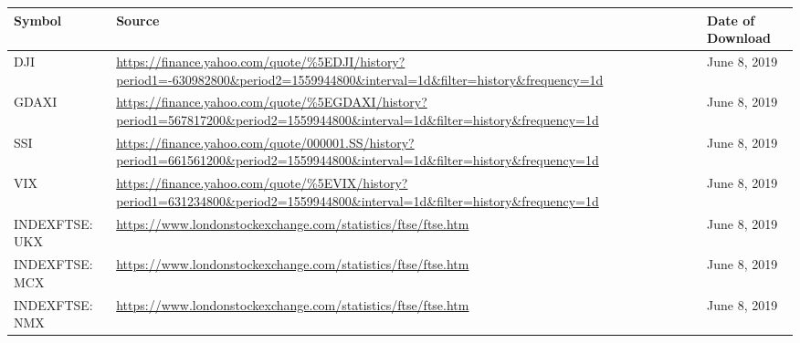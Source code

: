 \documentclass[12pt, a4paper]{article}
\begin{document}
        \begin{table}[H]
    \centering
        \begin{tabular}{p{3.0cm} p{10.0cm}l}
        \hline
        \textbf{Symbol}                                                             & \textbf{Source}                                                                                                                                              & \textbf{Date of Download} \\ \hline
       
        DJI                                                                         & \url{https://finance.yahoo.com/quote/\%5EDJI/history?period1=-630982800\&period2=1559944800\&interval=1d\&filter=history\&frequency=1d}     & June 8, 2019              \\
        GDAXI                                                                       & \url{https://finance.yahoo.com/quote/\%5EGDAXI/history?period1=567817200\&period2=1559944800\&interval=1d\&filter=history\&frequency=1d}    & June 8, 2019              \\
        SSI                                                                         & \url{https://finance.yahoo.com/quote/000001.SS/history?period1=661561200\&period2=1559944800\&interval=1d\&filter=history\&frequency=1d}    & June 8, 2019              \\
        VIX                                                                         & \url{https://finance.yahoo.com/quote/\%5EVIX/history?period1=631234800\&period2=1559944800\&interval=1d\&filter=history\&frequency=1d}      & June 8, 2019              \\
        INDEXFTSE: UKX                                                              & \url{https://www.londonstockexchange.com/statistics/ftse/ftse.htm}                                                                          & June 8, 2019              \\
        INDEXFTSE: MCX                                                              & \url{https://www.londonstockexchange.com/statistics/ftse/ftse.htm}                                                                          & June 8, 2019              \\
        INDEXFTSE: NMX                                                              & \url{https://www.londonstockexchange.com/statistics/ftse/ftse.htm}                                                                          & June 8, 2019              \\

\end{tabular}
\end{table}
\end{document}
